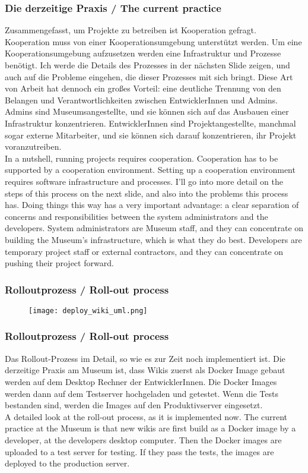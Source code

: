 {\scriptsize
\begin{frame}
  \frametitle{Die derzeitige Praxis / \textcolor{mfn_green}{The current practice}}
  Zusammengefasst, um Projekte zu betreiben ist Kooperation gefragt. Kooperation muss von einer Kooperationsumgebung unterstützt werden. Um eine Kooperationsumgebung aufzusetzen werden eine Infrastruktur und Prozesse benötigt. Ich werde die Details des Prozesses in der nächsten Slide zeigen, und auch auf die Probleme eingehen, die dieser Prozesses mit sich bringt. Diese Art von Arbeit hat dennoch ein großes Vorteil: eine deutliche Trennung von den Belangen und Verantwortlichkeiten zwischen EntwicklerInnen und Admins. Admins sind Museumsangestellte, und sie können sich auf das Ausbauen einer Infrastruktur konzentrieren. EntwicklerInnen sind Projektangestellte, manchmal sogar externe Mitarbeiter, und sie können sich darauf konzentrieren, ihr Projekt voranzutreiben.\\
  \bigskip
  \textcolor{mfn_green}{In a nutshell, running projects requires cooperation. Cooperation has to be supported by a cooperation environment. Setting up a cooperation environment requires software infrastructure and processes. I'll go into more detail on the steps of this process on the next slide, and also into the problems this process has. Doing things this way has a very important advantage: a clear separation of concerns and responsibilities between the system administrators and the developers. System administrators are Museum staff, and they can concentrate on building the Museum's infrastructure, which is what they do best. Developers are temporary project staff or external contractors, and they can concentrate on pushing their project forward.}
\end{frame}
}
\begin{frame}
  \frametitle{Rolloutprozess / \textcolor{mfn_green}{Roll-out process}}
  \begin{figure}
    \texttt{[image: deploy\_wiki\_uml.png]}
  \end{figure}
\end{frame}

{\scriptsize
\begin{frame}
  \frametitle{Rolloutprozess / \textcolor{mfn_green}{Roll-out process}}
  Das Rollout-Prozess im Detail, so wie es zur Zeit noch implementiert ist. Die derzeitige Praxis am Museum ist, dass Wikis zuerst als Docker Image gebaut werden auf dem Desktop Rechner der EntwicklerInnen. Die Docker Images werden dann auf dem Testserver hochgeladen und getestet. Wenn die Tests bestanden sind, werden die Images auf den Produktivserver eingesetzt.\\
  \bigskip
  \textcolor{mfn_green}{A detailed look at the roll-out process, as it is implemented now. The current practice at the Museum is that new wikis are first build as a Docker image by a developer, at the developers desktop computer. Then the Docker images are uploaded to a test server for testing. If they pass the tests, the images are deployed to the production server.}
\end{frame}
}
%
%

